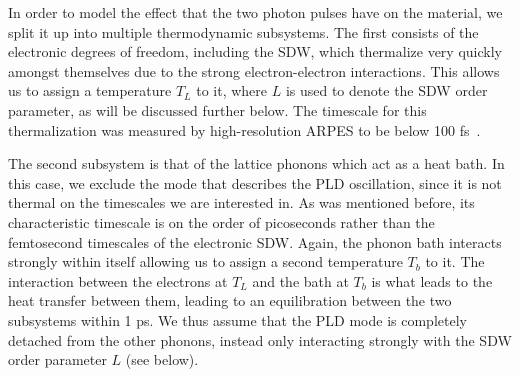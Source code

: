 
In order to model the effect that the two photon pulses have on the material, we split it up into multiple thermodynamic subsystems.
The first consists of the electronic degrees of freedom, including the SDW, which thermalize very quickly amongst themselves due to the strong electron-electron interactions.
This allows us to assign a temperature $T_L$ to it, where $L$ is used to denote the SDW order parameter, as will be discussed further below.
The timescale for this thermalization was measured by high-resolution ARPES to be below 100 fs~\cite{Nicholson2016}.

The second subsystem is that of the lattice phonons which act as a heat bath.
In this case, we exclude the mode that describes the PLD oscillation, since it is not thermal on the timescales we are interested in. As was mentioned before, its characteristic timescale is on the order of picoseconds rather than the femtosecond timescales of the electronic SDW.
Again, the phonon bath interacts strongly within itself allowing us to assign a second temperature $T_b$ to it.
The interaction between the electrons at $T_L$ and the bath at $T_b$ is what leads to the heat transfer between them, leading to an equilibration between the two subsystems within 1 ps.
We thus assume that the PLD mode is completely detached from the other phonons, instead only interacting strongly with the SDW order parameter $L$ (see below). 

